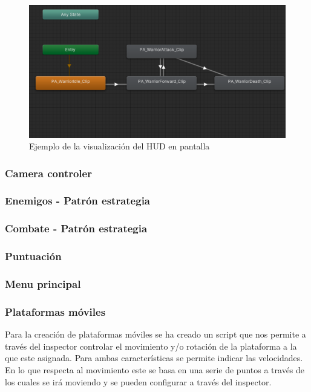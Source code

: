 \begin{figure}[H]
	\centering
	\includegraphics[scale=0.65]{imagenes/MaquinaEstados.png}
	\caption{\label{fig:MaquinaEstados}Ejemplo de la visualización del HUD en pantalla}
\end{figure}

\subsubsection{Camera controler}

\subsubsection{Enemigos - Patrón estrategia}

\subsubsection{Combate - Patrón estrategia}

\subsubsection{Puntuación}

\subsubsection{Menu principal}

\subsubsection{Plataformas móviles}
Para la creación de plataformas móviles se ha creado un script que nos permite a través del inspector controlar el movimiento y/o rotación de la plataforma a la que este asignada. Para ambas características se permite indicar las velocidades. En lo que respecta al movimiento este se basa en una serie de puntos a través de los cuales se irá moviendo y se pueden configurar a través del inspector.

